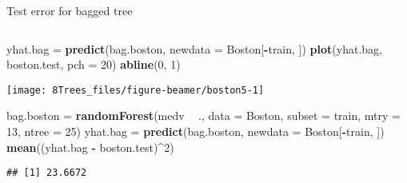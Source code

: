\documentclass[10pt,ignorenonframetext,]{beamer}
\newenvironment{Shaded}{\begin{snugshade}}{\end{snugshade}}
\newcommand{\DataTypeTok}[1]{\textcolor[rgb]{0.13,0.29,0.53}{#1}}
\newcommand{\DecValTok}[1]{\textcolor[rgb]{0.00,0.00,0.81}{#1}}
\newcommand{\KeywordTok}[1]{\textcolor[rgb]{0.13,0.29,0.53}{\textbf{#1}}}
\newcommand{\NormalTok}[1]{#1}
\newcommand{\OperatorTok}[1]{\textcolor[rgb]{0.81,0.36,0.00}{\textbf{#1}}}
\newcommand{\StringTok}[1]{\textcolor[rgb]{0.31,0.60,0.02}{#1}}
\begin{document}
\begin{frame}[fragile]

\begin{block}{Test error for bagged tree}

\(~\)

\scriptsize

\begin{Shaded}
\begin{Highlighting}[]
\NormalTok{yhat.bag =}\StringTok{ }\KeywordTok{predict}\NormalTok{(bag.boston, }\DataTypeTok{newdata =}\NormalTok{ Boston[}\OperatorTok{-}\NormalTok{train, ])}
\KeywordTok{plot}\NormalTok{(yhat.bag, boston.test, }\DataTypeTok{pch =} \DecValTok{20}\NormalTok{)}
\KeywordTok{abline}\NormalTok{(}\DecValTok{0}\NormalTok{, }\DecValTok{1}\NormalTok{)}
\end{Highlighting}
\end{Shaded}

\begin{center}\texttt{[image: 8Trees\_files/figure-beamer/boston5-1]} \end{center}

\vspace{2mm}

\scriptsize

\begin{Shaded}
\begin{Highlighting}[]
\NormalTok{bag.boston =}\StringTok{ }\KeywordTok{randomForest}\NormalTok{(medv }\OperatorTok{~}\StringTok{ }\NormalTok{., }\DataTypeTok{data =}\NormalTok{ Boston, }\DataTypeTok{subset =}\NormalTok{ train, }\DataTypeTok{mtry =} \DecValTok{13}\NormalTok{, }
    \DataTypeTok{ntree =} \DecValTok{25}\NormalTok{)}
\NormalTok{yhat.bag =}\StringTok{ }\KeywordTok{predict}\NormalTok{(bag.boston, }\DataTypeTok{newdata =}\NormalTok{ Boston[}\OperatorTok{-}\NormalTok{train, ])}
\KeywordTok{mean}\NormalTok{((yhat.bag }\OperatorTok{-}\StringTok{ }\NormalTok{boston.test)}\OperatorTok{^}\DecValTok{2}\NormalTok{)}
\end{Highlighting}
\end{Shaded}

\begin{verbatim}
## [1] 23.6672
\end{verbatim}

\end{block}

\end{frame}
\end{document}
